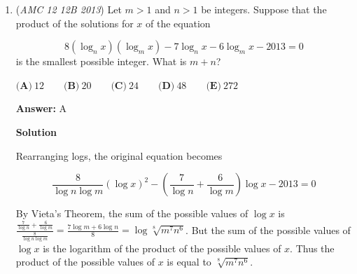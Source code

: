 \begin{enumerate}
\textbf{Solution 1}

Being on two parabolas means having the same distance from the common focus and both directrices. In particular, you have to be on an angle bisector of the directrices, and clearly on the same "side" of the directrices as the focus. So it's easy to see there are at most two solutions per pair of parabolae. Convexity and continuity imply exactly two solutions unless the directrices are parallel and on the same side of the focus.

 So out of $2\dbinom{30}{2}$ possible intersection points, only $2*5*2*\dbinom{3}{2}$ fail to exist. This leaves $870-60=810=\boxed{\textbf{(C)} \ 810}$ solutions.

 



\textbf{Solution 2}

Through similar reasoning as above in Solution I, determine that two parabolas that have a common focus intersect zero times if their directrixes are parallel and the focus lies on the same side of both directrixes, and intersect twice otherwise. Thereby, as each parabola will intersect $30-3 = 27$ other parabolas twice, we see that the answer is 
 \[2 \times \frac{30 \times 27}{2} = \boxed{810}.\]



	\item (\textit{AMC 12 12B 2013}) Let $m>1$ and $n>1$ be integers. Suppose that the product of the solutions for $x$ of the equation

 \[8(\log_n x)(\log_m x)-7\log_n x-6 \log_m x-2013 = 0\]
is the smallest possible integer. What is $m+n$?


 $\textbf{(A)}\ 12\qquad\textbf{(B)}\ 20\qquad\textbf{(C)}\ 24\qquad\textbf{(D)}\ 48\qquad\textbf{(E)}\ 272$

 \textbf{Answer: }A



\textbf{Solution}

Rearranging logs, the original equation becomes

 
 
 \[\frac{8}{\log n \log m}(\log x)^2 - \left(\frac{7}{\log n}+\frac{6}{\log m}\right)\log x - 2013 = 0\]

 
 

 
	By Vieta's Theorem, the sum of the possible values of $\log x$ is $\frac{\frac{7}{\log n}+\frac{6}{\log m}}{\frac{8}{\log n \log m}} = \frac{7\log m + 6 \log n}{8} = \log \sqrt[8]{m^7n^6}$. But the sum of the possible values of $\log x$ is the logarithm of the product of the possible values of $x$. Thus the product of the possible values of $x$ is equal to $\sqrt[8]{m^7n^6}$.


\end{enumerate}

